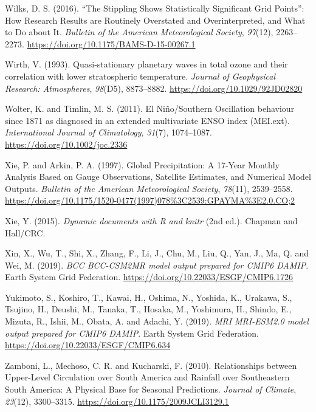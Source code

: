 \documentclass[12pt,oneside,a4paper]{reedthesis}
\newlength{\cslhangindent}
\newenvironment{CSLReferences}[2] %
 {%
  \setlength{\parindent}{0pt}
  \ifodd #1 \everypar{\setlength{\hangindent}{\cslhangindent}}\ignorespaces\fi
  \ifnum #2 > 0
  \setlength{\parskip}{#2\baselineskip}
  \fi
 }%
 {}
\begin{document}
\begin{CSLReferences}{1}{0}
\leavevmode{}%
Wilks, D. S. (2016). {``{The Stippling Shows Statistically Significant Grid Points}''}: {How Research Results} are {Routinely Overstated} and {Overinterpreted}, and {What} to {Do} about {It}. \emph{Bulletin of the American Meteorological Society}, \emph{97}(12), 2263--2273. \url{https://doi.org/10.1175/BAMS-D-15-00267.1}

\leavevmode{}%
Wirth, V. (1993). Quasi-stationary planetary waves in total ozone and their correlation with lower stratospheric temperature. \emph{Journal of Geophysical Research: Atmospheres}, \emph{98}(D5), 8873--8882. \url{https://doi.org/10.1029/92JD02820}

\leavevmode{}%
Wolter, K. and Timlin, M. S. (2011). El {Ni{ñ}o}/{Southern Oscillation} behaviour since 1871 as diagnosed in an extended multivariate {ENSO} index ({MEI}.ext). \emph{International Journal of Climatology}, \emph{31}(7), 1074--1087. \url{https://doi.org/10.1002/joc.2336}

\leavevmode{}%
Xie, P. and Arkin, P. A. (1997). Global {Precipitation}: {A} 17-{Year Monthly Analysis Based} on {Gauge Observations}, {Satellite Estimates}, and {Numerical Model Outputs}. \emph{Bulletin of the American Meteorological Society}, \emph{78}(11), 2539--2558. \url{https://doi.org/10.1175/1520-0477(1997)078\%3C2539:GPAYMA\%3E2.0.CO;2}

\leavevmode{}%
Xie, Y. (2015). \emph{Dynamic documents with {R} and knitr} (2nd ed.). {Chapman and Hall/CRC}.

\leavevmode{}%
Xin, X., Wu, T., Shi, X., Zhang, F., Li, J., Chu, M., Liu, Q., Yan, J., Ma, Q. and Wei, M. (2019). \emph{BCC BCC-CSM2MR model output prepared for CMIP6 DAMIP}. Earth System Grid Federation. \url{https://doi.org/10.22033/ESGF/CMIP6.1726}

\leavevmode{}%
Yukimoto, S., Koshiro, T., Kawai, H., Oshima, N., Yoshida, K., Urakawa, S., Tsujino, H., Deushi, M., Tanaka, T., Hosaka, M., Yoshimura, H., Shindo, E., Mizuta, R., Ishii, M., Obata, A. and Adachi, Y. (2019). \emph{MRI MRI-ESM2.0 model output prepared for CMIP6 DAMIP}. Earth System Grid Federation. \url{https://doi.org/10.22033/ESGF/CMIP6.634}

\leavevmode{}%
Zamboni, L., Mechoso, C. R. and Kucharski, F. (2010). Relationships between {Upper-Level Circulation} over {South America} and {Rainfall} over {Southeastern South America}: {A Physical Base} for {Seasonal Predictions}. \emph{Journal of Climate}, \emph{23}(12), 3300--3315. \url{https://doi.org/10.1175/2009JCLI3129.1}


\end{CSLReferences}
\end{document}
